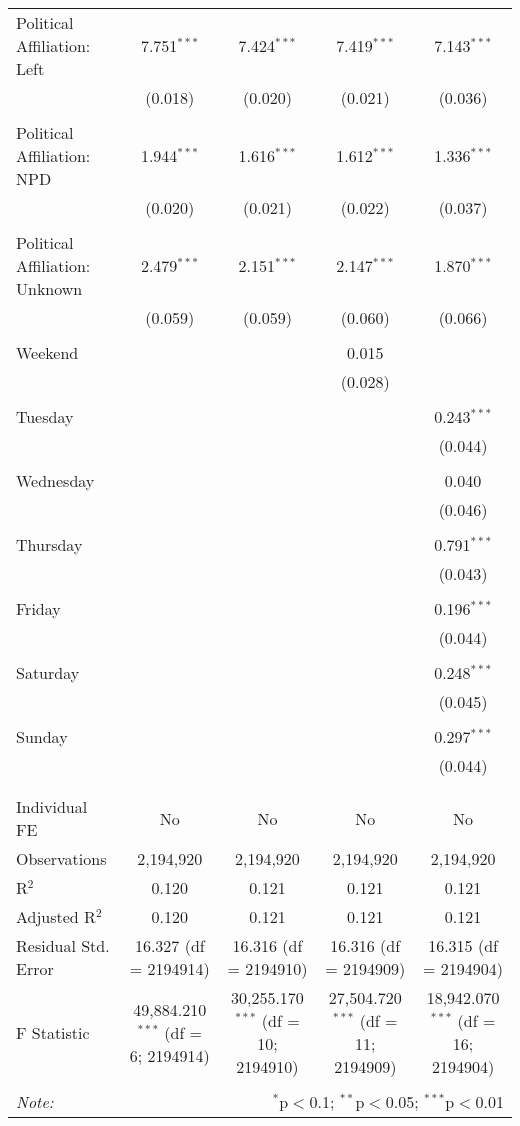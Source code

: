\documentclass[
]{article}
\begin{document}
\begin{table}[!htbp]
{\begin{tabular}{@{\extracolsep{5pt}}lcccc}
 Political Affiliation: Left & 7.751$^{***}$ & 7.424$^{***}$ & 7.419$^{***}$ & 7.143$^{***}$ \\ 
  & (0.018) & (0.020) & (0.021) & (0.036) \\ 
  & & & & \\ 
 Political Affiliation: NPD & 1.944$^{***}$ & 1.616$^{***}$ & 1.612$^{***}$ & 1.336$^{***}$ \\ 
  & (0.020) & (0.021) & (0.022) & (0.037) \\ 
  & & & & \\ 
 Political Affiliation: Unknown & 2.479$^{***}$ & 2.151$^{***}$ & 2.147$^{***}$ & 1.870$^{***}$ \\ 
  & (0.059) & (0.059) & (0.060) & (0.066) \\ 
  & & & & \\ 
 Weekend &  &  & 0.015 &  \\ 
  &  &  & (0.028) &  \\ 
  & & & & \\ 
 Tuesday &  &  &  & 0.243$^{***}$ \\ 
  &  &  &  & (0.044) \\ 
  & & & & \\ 
 Wednesday &  &  &  & 0.040 \\ 
  &  &  &  & (0.046) \\ 
  & & & & \\ 
 Thursday &  &  &  & 0.791$^{***}$ \\ 
  &  &  &  & (0.043) \\ 
  & & & & \\ 
 Friday &  &  &  & 0.196$^{***}$ \\ 
  &  &  &  & (0.044) \\ 
  & & & & \\ 
 Saturday &  &  &  & 0.248$^{***}$ \\ 
  &  &  &  & (0.045) \\ 
  & & & & \\ 
 Sunday &  &  &  & 0.297$^{***}$ \\ 
  &  &  &  & (0.044) \\ 
  & & & & \\ 
\hline \\[-1.8ex] 
Individual FE & No & No & No & No \\ 
Observations & 2,194,920 & 2,194,920 & 2,194,920 & 2,194,920 \\ 
R$^{2}$ & 0.120 & 0.121 & 0.121 & 0.121 \\ 
Adjusted R$^{2}$ & 0.120 & 0.121 & 0.121 & 0.121 \\ 
Residual Std. Error & 16.327 (df = 2194914) & 16.316 (df = 2194910) & 16.316 (df = 2194909) & 16.315 (df = 2194904) \\ 
F Statistic & 49,884.210$^{***}$ (df = 6; 2194914) & 30,255.170$^{***}$ (df = 10; 2194910) & 27,504.720$^{***}$ (df = 11; 2194909) & 18,942.070$^{***}$ (df = 16; 2194904) \\ 
\hline 
\hline \\[-1.8ex] 
\textit{Note:}  & \multicolumn{4}{r}{$^{*}$p$<$0.1; $^{**}$p$<$0.05; $^{***}$p$<$0.01} \\ 
\end{tabular}
} 
\end{table} 
\newpage
\end{document}
